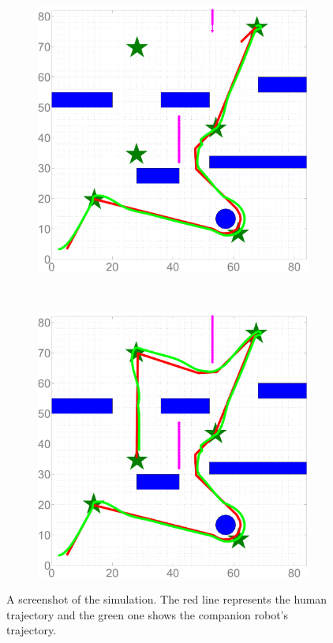 \documentclass[letterpaper, 10 pt, conference]{ieeeconf}
\begin{document}
\begin{figure}
\begin{subfigure}{0.2\textwidth}
			\caption{}
			\label{fig:ref_traj_obs1}
		\end{subfigure}
		~
		\begin{subfigure}{0.2\textwidth}
			\includegraphics[width=\textwidth]{figures/sim_traj_obs2}
			\caption{}
			\label{fig:ref_traj_obs2}
		\end{subfigure}
		~
		\begin{subfigure}{0.2\textwidth}
			\includegraphics[width=\textwidth]{figures/sim_traj_end}
			\caption{}
			\label{fig:ref_traj_accom}
		\end{subfigure}
		\caption{A screenshot of the simulation. The red line represents the human trajectory and the green one shows the companion robot's trajectory.}
	\end{figure}	
\end{document}
